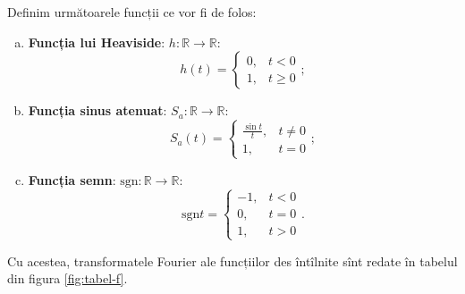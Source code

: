 \documentclass[12pt,a4paper]{article}
\newcommand\RR{\mathbb{R}}
\theoremstyle{dotless}
\theoremstyle{dotlessdr}
\begin{document}
\indent\indent Definim următoarele funcții ce vor fi de folos:
\begin{enumerate}[(a)]
\item \textbf{Funcția lui Heaviside}: $ h : \RR \to \RR $:
  \[
    h(t) = \begin{cases}
      0, & t < 0 \\
      1, & t \geq 0
    \end{cases};
  \]
\item \textbf{Funcția sinus atenuat}: $ S_a : \RR \to \RR $:
  \[
    S_a(t) = \begin{cases}
      \frac{\sin t}{t}, & t \neq 0 \\
      1, & t = 0
    \end{cases};
  \]
\item \textbf{Funcția semn}: $ \mathrm{sgn} : \RR \to \RR $:
  \[
    \mathrm{sgn} t = \begin{cases}
      -1, & t < 0 \\
      0, & t = 0 \\
      1, & t > 0
    \end{cases}.
  \]
\end{enumerate}

Cu acestea, transformatele Fourier ale funcțiilor des întîlnite sînt redate în
tabelul din figura \ref{fig:tabel-f}.
\end{document}
